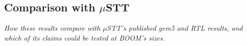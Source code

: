 
\subsection{Comparison with $\mu$STT}
\label{sec:results_comparison}

\textit{How these results compare with $\mu$STT's published gem5 and RTL results, and which of its claims could be tested at BOOM's sizes.}
